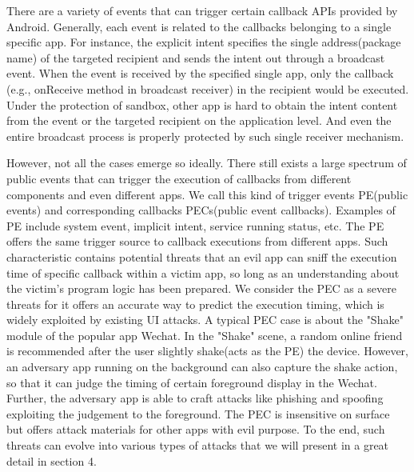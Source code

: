 \documentclass{sig-alternate-05-2015}
\begin{document}
There are a variety of events that can trigger certain callback APIs provided by Android. Generally, each event is related to the callbacks belonging to a single specific app. For instance, the explicit intent specifies the single address(package name) of the targeted recipient and sends the intent out through a broadcast event. When the event is received by the specified single app, only the callback (e.g., onReceive method in broadcast receiver) in the recipient would be executed. Under the protection of sandbox, other app is hard to obtain the intent content from the event or the targeted recipient on the application level. And even the entire broadcast process is properly protected by such single receiver mechanism. 

However, not all the cases emerge so ideally. There still exists a large spectrum of public events that can trigger the execution of callbacks from different components and even different apps. We call this kind of trigger events PE(public events) and corresponding callbacks PECs(public event callbacks). Examples of PE include system event, implicit intent, service running status, etc. The PE offers the same trigger source to callback executions from different apps. Such characteristic contains potential threats that an evil app can sniff the execution time of specific callback within a victim app, so long as an understanding about the victim's program logic has been prepared. We consider the PEC as a severe threats for it offers an accurate way to predict the execution timing, which is widely exploited by existing UI attacks\cite{chen2014peeking}\cite{bianchi2015app}\cite{ren2015towards}. A typical PEC case is about the "Shake" module of the popular app Wechat. In the "Shake" scene, a random online friend is recommended after the user slightly shake(acts as the PE) the device. However, an adversary app running on the background can also capture the shake action, so that it can judge the timing of certain foreground display in the Wechat. Further, the adversary app is able to craft attacks like phishing and spoofing exploiting the judgement to the foreground. The PEC is insensitive on surface but offers attack materials for other apps with evil purpose. To the end, such threats can evolve into various types of attacks that we will present in a great detail in section 4.

\end{document}
